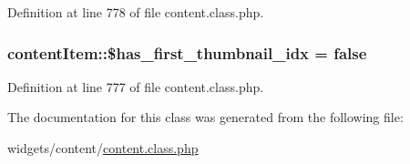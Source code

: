 Definition at line 778 of file content.\-class.\-php.

\hypertarget{classcontentItem_a78da7867160d34bf7e422524f6a78c37}{
\subsubsection[{\$has\-\_\-first\-\_\-thumbnail\-\_\-idx}]{\setlength{\rightskip}{0pt plus 5cm}content\-Item\-::\$has\-\_\-first\-\_\-thumbnail\-\_\-idx = false}}\label{classcontentItem_a78da7867160d34bf7e422524f6a78c37}


Definition at line 777 of file content.\-class.\-php.



The documentation for this class was generated from the following file\-:\begin{DoxyCompactItemize}
\item 
widgets/content/\hyperlink{content_8class_8php}{content.\-class.\-php}\end{DoxyCompactItemize}

